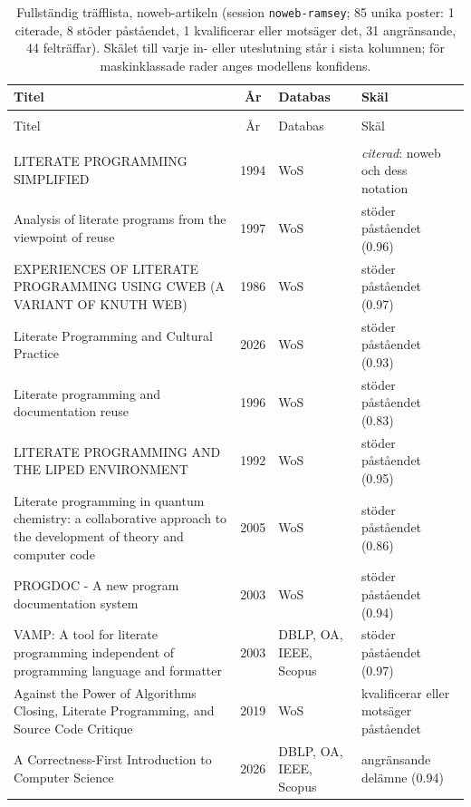 \begingroup\footnotesize
\begin{longtable}{@{}%
  >{\raggedright\arraybackslash}p{}c%
  >{\raggedright\arraybackslash}p{}%
  >{\raggedright\arraybackslash}p{}@{}}
\caption{Fullständig träfflista, noweb-artikeln (session \texttt{noweb-ramsey}; 85 unika poster: 1 citerade, 8 stöder påståendet, 1 kvalificerar eller motsäger det, 31 angränsande, 44 felträffar).  Skälet till varje in- eller uteslutning står i sista kolumnen; för maskinklassade rader anges modellens konfidens.}\label{tab:sok-noweb}\\
\toprule
Titel & År & Databas & Skäl \\
\midrule
\endfirsthead
\multicolumn{4}{@{}l}{\emph{\tablename~\thetable{} (forts.)}}\\
\toprule Titel & År & Databas & Skäl \\ \midrule
\endhead
\midrule \multicolumn{4}{r@{}}{\emph{forts.\ på nästa sida}}\\
\endfoot
\bottomrule
\endlastfoot
LITERATE PROGRAMMING SIMPLIFIED & 1994 & WoS & \emph{citerad}: noweb och dess notation \\
Analysis of literate programs from the viewpoint of reuse & 1997 & WoS & stöder påståendet (0.96) \\
EXPERIENCES OF LITERATE PROGRAMMING USING CWEB (A VARIANT OF KNUTH WEB) & 1986 & WoS & stöder påståendet (0.97) \\
Literate Programming and Cultural Practice & 2026 & WoS & stöder påståendet (0.93) \\
Literate programming and documentation reuse & 1996 & WoS & stöder påståendet (0.83) \\
LITERATE PROGRAMMING AND THE LIPED ENVIRONMENT & 1992 & WoS & stöder påståendet (0.95) \\
Literate programming in quantum chemistry: a collaborative approach to the development of theory and computer code & 2005 & WoS & stöder påståendet (0.86) \\
PROGDOC - A new program documentation system & 2003 & WoS & stöder påståendet (0.94) \\
VAMP: A tool for literate programming independent of programming language and formatter & 2003 & DBLP, OA, IEEE, Scopus & stöder påståendet (0.97) \\
Against the Power of Algorithms Closing, Literate Programming, and Source Code Critique & 2019 & WoS & kvalificerar eller motsäger påståendet \\
A Correctness-First Introduction to Computer Science & 2026 & DBLP, OA, IEEE, Scopus & angränsande delämne (0.94) \\

\end{longtable}
